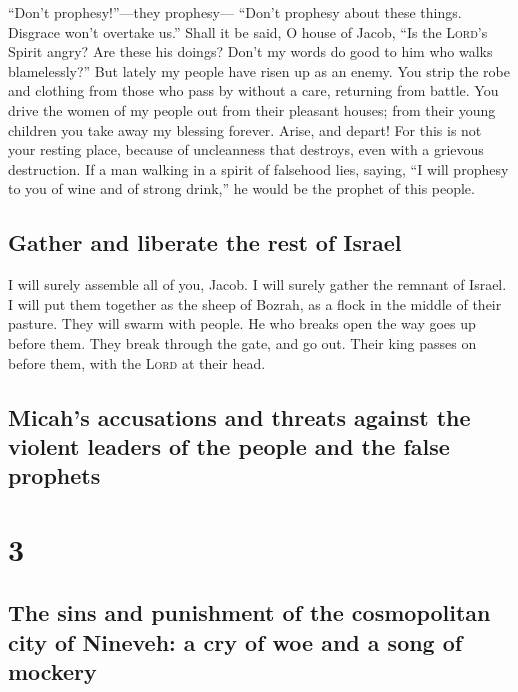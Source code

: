 ``Don't prophesy!''---they prophesy--- ``Don't prophesy
about these things. Disgrace won't overtake us.''  Shall
it be said, O house of Jacob, ``Is the \textsc{Lord}'s Spirit angry? Are
these his doings? Don't my words do good to him who walks blamelessly?''
 But lately my people have risen up as an enemy. You strip
the robe and clothing from those who pass by without a care, returning
from battle.  You drive the women of my people out from
their pleasant houses; from their young children you take away my
blessing forever.  Arise, and depart! For this is not
your resting place, because of uncleanness that destroys, even with a
grievous destruction.  If a man walking in a spirit of
falsehood lies, saying, ``I will prophesy to you of wine and of strong
drink,'' he would be the prophet of this people.

\hypertarget{gather-and-liberate-the-rest-of-israel}{%
\subsection{Gather and liberate the rest of
Israel}\label{gather-and-liberate-the-rest-of-israel}}

 I will surely assemble all of you, Jacob. I will surely
gather the remnant of Israel. I will put them together as the sheep of
Bozrah, as a flock in the middle of their pasture. They will swarm with
people.  He who breaks open the way goes up before them.
They break through the gate, and go out. Their king passes on before
them, with the \textsc{Lord} at their head.

\hypertarget{micahs-accusations-and-threats-against-the-violent-leaders-of-the-people-and-the-false-prophets}{%
\subsection{Micah's accusations and threats against the violent leaders
of the people and the false
prophets}\label{micahs-accusations-and-threats-against-the-violent-leaders-of-the-people-and-the-false-prophets}}

\hypertarget{section-2}{%
\section{3}\label{section-2}}

\hypertarget{the-sins-and-punishment-of-the-cosmopolitan-city-of-nineveh-a-cry-of-woe-and-a-song-of-mockery}{%
\subsection{The sins and punishment of the cosmopolitan city of Nineveh:
a cry of woe and a song of
mockery}\label{the-sins-and-punishment-of-the-cosmopolitan-city-of-nineveh-a-cry-of-woe-and-a-song-of-mockery}}

